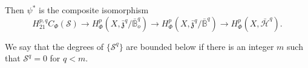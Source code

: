 Then $\psi^*$ is the composite isomorphism 
$$
 H^{p,q}_{21} C_{\Phi}(\mathscr{S}) \to H^p_{\Phi}(X,\bar{\mathfrak{z}}^q /
\bar{\mathbb{B}}^q_o) \to H^p_{\Phi}(X,\bar{\mathfrak{z}}^q /
\bar{\mathbb{B}}^q) \to H^p_{\Phi}(X,\bar{\mathscr{H}}^q). 
$$ 

\begin{defi*}%
We say that the degrees of $\{ \mathscr{S}^q \}$ are bounded below if
there is an integer $m$ such that $\mathscr{S}^q = 0$ for $q < m$. 
\end{defi*}




